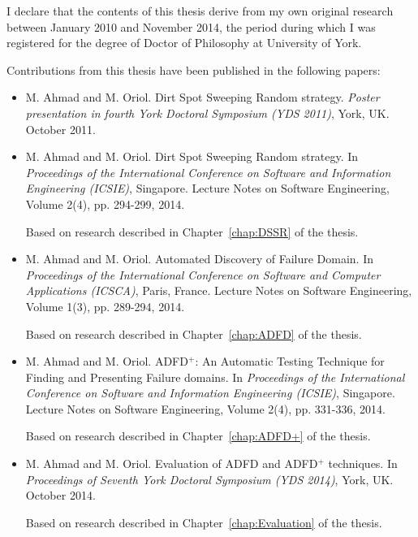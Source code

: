 \begin{declaration}

I declare that the contents of this thesis derive from my own original research between January 2010 and November 2014, the period during which I was registered for the degree of Doctor of Philosophy at University of York.

Contributions from this thesis have been published in the following papers: 

\begin{itemize}

\item M. Ahmad and M. Oriol. Dirt Spot Sweeping Random strategy. \textit{Poster presentation in fourth York Doctoral Symposium (YDS 2011)}, York, UK. October 2011.

\item M. Ahmad and M. Oriol. Dirt Spot Sweeping Random strategy. In \textit{Proceedings of the International Conference on Software and Information Engineering (ICSIE)}, Singapore. Lecture Notes on Software Engineering, Volume 2(4), pp. 294-299, 2014.

Based on research described in Chapter~\ref{chap:DSSR} of the thesis.\\

\item M. Ahmad and M. Oriol. Automated Discovery of Failure Domain. In \textit{Proceedings of the International Conference on Software and Computer Applications (ICSCA)}, Paris, France. Lecture Notes on Software Engineering, Volume 1(3), pp. 289-294, 2014.

Based on research described in Chapter~\ref{chap:ADFD} of the thesis.\\

\item M. Ahmad and M. Oriol. ADFD$^+$: An Automatic Testing Technique for Finding and Presenting Failure domains. In \textit{Proceedings of the International Conference on Software and Information Engineering (ICSIE)}, Singapore. Lecture Notes on Software Engineering, Volume 2(4), pp. 331-336, 2014.

Based on research described in Chapter~\ref{chap:ADFD+} of the thesis.\\

\item M. Ahmad and M. Oriol. Evaluation of ADFD and ADFD$^+$ techniques. In \textit{Proceedings of Seventh York Doctoral Symposium (YDS 2014)}, York, UK. October 2014. 

Based on research described in Chapter~\ref{chap:Evaluation} of the thesis.

\end{itemize}

\end{declaration}